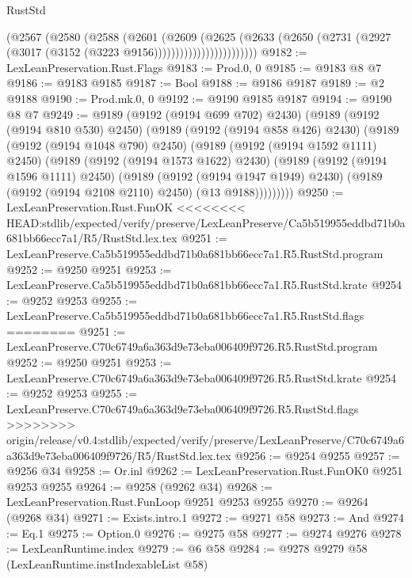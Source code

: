 \begin{lexlean}{RustStd}
\begin{coremodule}
{\begin{coremodule}
{{{{{{{{{{{{{{{{{{{{{{{{{{{{{{{{{{{{{{{{{{{{{{{{{{{{{{{                          (@2567
                            (@2580
                              (@2588
                                (@2601
                                  (@2609
                                    (@2625
                                      (@2633
                                        (@2650
                                          (@2731
                                            (@2927
                                              (@3017 (@3152 (@3223 @9156))))))))))))))))))))))))
@9182 := LexLeanPreservation.Rust.Flags
@9183 := Prod.{0, 0}
@9185 := @9183 @8 @7
@9186 := @9183 @9185
@9187 := Bool
@9188 := @9186 @9187
@9189 := @2 @9188
@9190 := Prod.mk.{0, 0}
@9192 := @9190 @9185 @9187
@9194 := @9190 @8 @7
@9249 := @9189
    (@9192 (@9194 @699 @702) @2430)
    (@9189
      (@9192 (@9194 @810 @530) @2450)
      (@9189
        (@9192 (@9194 @858 @426) @2430)
        (@9189
          (@9192 (@9194 @1048 @790) @2450)
          (@9189
            (@9192 (@9194 @1592 @1111) @2450)
            (@9189
              (@9192 (@9194 @1573 @1622) @2430)
              (@9189
                (@9192 (@9194 @1596 @1111) @2450)
                (@9189
                  (@9192 (@9194 @1947 @1949) @2430)
                  (@9189 (@9192 (@9194 @2108 @2110) @2450) (@13 @9188)))))))))
@9250 := LexLeanPreservation.Rust.FunOK
<<<<<<<< HEAD:stdlib/expected/verify/preserve/LexLeanPreserve/Ca5b519955eddbd71b0a681bb66ecc7a1/R5/RustStd.lex.tex
@9251 := LexLeanPreserve.Ca5b519955eddbd71b0a681bb66ecc7a1.R5.RustStd.program
@9252 := @9250 @9251
@9253 := LexLeanPreserve.Ca5b519955eddbd71b0a681bb66ecc7a1.R5.RustStd.krate
@9254 := @9252 @9253
@9255 := LexLeanPreserve.Ca5b519955eddbd71b0a681bb66ecc7a1.R5.RustStd.flags
========
@9251 := LexLeanPreserve.C70c6749a6a363d9e73eba006409f9726.R5.RustStd.program
@9252 := @9250 @9251
@9253 := LexLeanPreserve.C70c6749a6a363d9e73eba006409f9726.R5.RustStd.krate
@9254 := @9252 @9253
@9255 := LexLeanPreserve.C70c6749a6a363d9e73eba006409f9726.R5.RustStd.flags
>>>>>>>> origin/release/v0.4:stdlib/expected/verify/preserve/LexLeanPreserve/C70c6749a6a363d9e73eba006409f9726/R5/RustStd.lex.tex
@9256 := @9254 @9255
@9257 := @9256 @34
@9258 := Or.inl
@9262 := LexLeanPreservation.Rust.FunOK0 @9251 @9253 @9255
@9264 := @9258 (@9262 @34)
@9268 := LexLeanPreservation.Rust.FunLoop @9251 @9253 @9255
@9270 := @9264 (@9268 @34)
@9271 := Exists.intro.{1}
@9272 := @9271 @58
@9273 := And
@9274 := Eq.{1}
@9275 := Option.{0}
@9276 := @9275 @58
@9277 := @9274 @9276
@9278 := LexLeanRuntime.index
@9279 := @6 @58
@9284 := @9278 @9279 @58 (LexLeanRuntime.instIndexableList @58)
}}}}}}}}}}}}}}}}}}}}}}}}}}}}}}}}}}}}}}}}}}}}}}}}}}}}}}}
\end{coremodule}}
\end{coremodule}
\end{lexlean}
